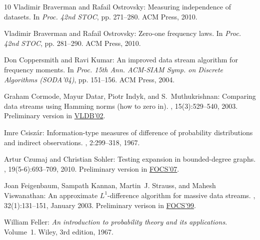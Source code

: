 \begin{thebibliography}{10}
{\sc Vladimir Braverman and Rafail Ostrovsky}: Measuring independence of
  datasets.
\newblock In {\em Proc. 42nd STOC}, pp. 271--280. ACM Press, 2010.
\newblock [\epfmtdoi{10.1145/1806689.1806728}]

{\sc Vladimir Braverman and Rafail Ostrovsky}: Zero-one frequency laws.
\newblock In {\em Proc. 42nd STOC}, pp. 281--290. ACM Press, 2010.
\newblock [\epfmtdoi{10.1145/1806689.1806729}]

{\sc Don Coppersmith and Ravi Kumar}: An improved data stream algorithm for
  frequency moments.
\newblock In {\em Proc. 15th Ann. ACM-SIAM Symp. on Discrete Algorithms
  (SODA'04)}, pp. 151--156. ACM Press, 2004.

{\sc Graham Cormode, Mayur Datar, Piotr Indyk, and S.~Muthukrishnan}: Comparing
  data streams using {H}amming norms (how to zero in).
, 15(3):529--540, 2003.
\newblock Preliminary version in
  \href{http://www.vldb.org/conf/2002/S10P02.pdf}{VLDB'02}.

{\sc Imre Csisz\'{a}r}: Information-type measures of difference of probability
  distributions and indirect observations.
, 2:299--318, 1967.

{\sc Artur Czumaj and Christian Sohler}: Testing expansion in bounded-degree
  graphs.
, 19(5-6):693--709,
  2010.
\newblock Preliminary version in
  \href{http://dx.doi.org/10.1109/FOCS.2007.33}{FOCS'07}.
\newblock [\epfmtdoi{10.1017/S096354831000012X}]

{\sc Joan Feigenbaum, Sampath Kannan, Martin~J. Strauss, and Mahesh
  Viswanathan}: An approximate ${L}^1$-difference algorithm for massive data
  streams.
, 32(1):131--151, January 2003.
\newblock Preliminary verison in
  \href{http://dx.doi.org/10.1109/SFFCS.1999.814623}{FOCS'99}.
\newblock [\epfmtdoi{10.1137/S0097539799361701}]

{\sc William Feller}: {\em An introduction to probability theory and its
  applications}.
\newblock Volume~1.
\newblock Wiley, 3rd edition, 1967.


\end{thebibliography}
